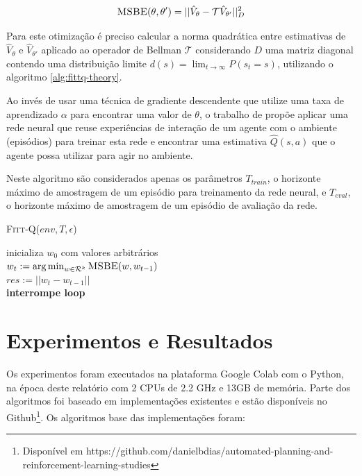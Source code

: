 \documentclass[letterpaper]{article}
\begin{document}
\begin{equation} \label{eq:msbe}
  \textsc{MSBE}(\theta, \theta') = || \hat{V}_{\theta} - \mathcal{T} \hat{V}_{\theta'} ||^2_D
\end{equation}

Para este otimização é preciso calcular a norma quadrática entre estimativas de $\hat{V}_{\theta}$ e $\hat{V}_{\theta'}$ aplicado ao operador de Bellman $\mathcal{T}$ considerando $D$ uma matriz diagonal contendo uma distribuição limite $d(s) = \lim_{t \rightarrow \infty} P(s_t = s)$, utilizando o algoritmo \ref{alg:fittq-theory}.

Ao invés de usar uma técnica de gradiente descendente que utilize uma taxa de aprendizado $\alpha$ para encontrar uma valor de $\theta$, o trabalho de \cite{Riedmiller-2005} propõe aplicar uma rede neural que reuse experiências de interação de um agente com o ambiente (episódios) para treinar esta rede e encontrar uma estimativa $\hat{Q}(s, a)$ que o agente possa utilizar para agir no ambiente. 

Neste algoritmo são considerados apenas os parâmetros $T_{train}$, o horizonte máximo de amostragem de um episódio para treinamento da rede neural, e $T_{eval}$, o horizonte máximo de amostragem de um episódio de avaliação da rede.

\linesnumbered
\dontprintsemicolon
\begin{algorithm}[t!]
{
	\caption{\textsc{Fitt-Q}($ env, T, \epsilon $)}
	\label{alg:fittq-theory}
    inicializa $ w_0 $ com valores arbitrários \\

    {
      $w_t := \arg \min_{w \in \mathcal{R}^k} \textsc{MSBE}(w, w_{t-1}) $ \\
      $res := || w_t - w_{t-1} ||$ \\

      {
        \textbf{interrompe loop}
      }
    }
}
\end{algorithm}

\section{Experimentos e Resultados}

Os experimentos foram executados na plataforma Google Colab com o Python, na época deste relatório com 2 CPUs de 2.2 GHz e 13GB de memória. Parte dos algoritmos foi baseado em implementações existentes e estão disponíveis no Github\footnote{Disponível em https://github.com/danielbdias/automated-planning-and-reinforcement-learning-studies}. Os algoritmos base das implementações foram:
\end{document}
